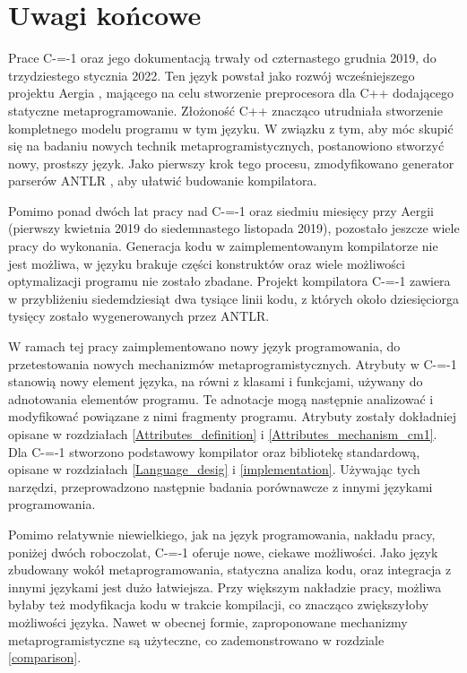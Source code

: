 \section{Uwagi końcowe}

Prace C-=-1 oraz jego dokumentacją trwały od czternastego grudnia 2019, do trzydziestego stycznia 2022.
Ten język powstał jako rozwój wcześniejszego projektu Aergia \cite{grabski:aergia}, mającego na celu stworzenie preprocesora dla C++ dodającego statyczne metaprogramowanie.
Złożoność C++ znacząco utrudniała stworzenie kompletnego modelu programu w tym języku.
W związku z tym, aby móc skupić się na badaniu nowych technik metaprogramistycznych, postanowiono stworzyć nowy, prostszy język.
Jako pierwszy krok tego procesu, zmodyfikowano generator parserów ANTLR \cite{grabski2020}, aby ułatwić budowanie kompilatora.

Pomimo ponad dwóch lat pracy nad C-=-1 oraz siedmiu miesięcy przy Aergii (pierwszy kwietnia 2019 do siedemnastego listopada 2019), pozostało jeszcze wiele pracy do wykonania.
Generacja kodu w zaimplementowanym kompilatorze nie jest możliwa, w języku brakuje części konstruktów oraz wiele możliwości optymalizacji programu nie zostało zbadane.
Projekt kompilatora C-=-1 zawiera w przybliżeniu siedemdziesiąt dwa tysiące linii kodu, z których około dziesięciorga tysięcy zostało wygenerowanych przez ANTLR.

W ramach tej pracy zaimplementowano nowy język programowania, do przetestowania nowych mechanizmów metaprogramistycznych.
Atrybuty w C-=-1 stanowią nowy element języka, na równi z klasami i funkcjami, używany do adnotowania elementów programu.
Te adnotacje mogą następnie analizować i modyfikować powiązane z nimi fragmenty programu.
Atrybuty zostały dokładniej opisane w rozdziałach \ref{Attributes_definition} i \ref{Attributes_mechanism_cm1}.
Dla C-=-1 stworzono podstawowy kompilator oraz bibliotekę standardową, opisane w rozdziałach \ref{Language_desig} i \ref{implementation}.
Używając tych narzędzi, przeprowadzono następnie badania porównawcze z innymi językami programowania.

Pomimo relatywnie niewielkiego, jak na język programowania, nakładu pracy, poniżej dwóch roboczolat, C-=-1 oferuje nowe, ciekawe możliwości.
Jako język zbudowany wokół metaprogramowania, statyczna analiza kodu, oraz integracja z innymi językami jest dużo łatwiejsza.
Przy większym nakładzie pracy, możliwa byłaby też modyfikacja kodu w trakcie kompilacji, co znacząco zwiększyłoby możliwości języka.
Nawet w obecnej formie, zaproponowane mechanizmy metaprogramistyczne są użyteczne, co zademonstrowano w rozdziale \ref{comparison}.

